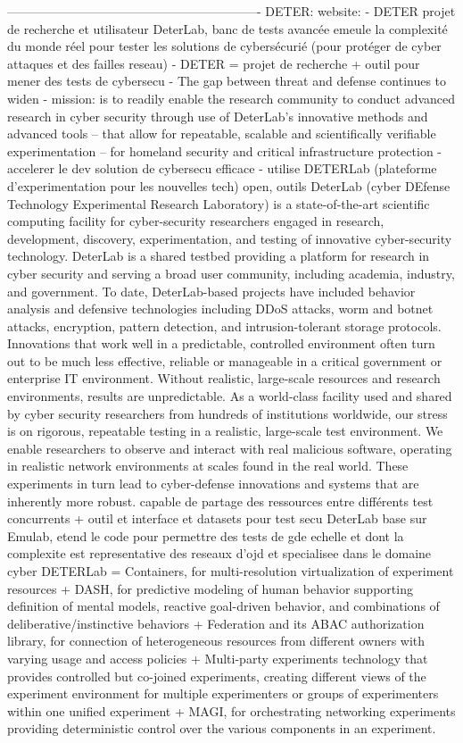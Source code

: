 -------------------------------------------------------------
DETER:
website:
- DETER projet de recherche et utilisateur DeterLab, banc de tests avancée emeule la complexité du monde réel pour tester les solutions de cybersécurié (pour protéger de cyber attaques et des failles reseau)
- DETER = projet de recherche + outil pour mener des tests de cybersecu
- The gap between threat and defense continues to widen
- mission: is to readily enable the research community to conduct advanced research in cyber security through use of DeterLab's innovative methods and advanced tools -- that allow for repeatable, scalable and scientifically verifiable experimentation -- for homeland security and critical infrastructure protection
- accelerer le dev solution de cybersecu efficace
- utilise DETERLab (plateforme d'experimentation pour les nouvelles tech) open, outils
DeterLab (cyber DEfense Technology Experimental Research Laboratory) is a state-of-the-art scientific computing facility for cyber-security researchers engaged in research, development, discovery, experimentation, and testing of innovative cyber-security technology. DeterLab is a shared testbed providing a platform for research in cyber security and serving a broad user community, including academia, industry, and government. To date, DeterLab-based projects have included behavior analysis and defensive technologies including DDoS attacks, worm and botnet attacks, encryption, pattern detection, and intrusion-tolerant storage protocols.
Innovations that work well in a predictable, controlled environment often turn out to be much less effective, reliable or manageable in a critical government or enterprise IT environment. Without realistic, large-scale resources and research environments, results are unpredictable. As a world-class facility used and shared by cyber security researchers from hundreds of institutions worldwide, our stress is on rigorous, repeatable testing in a realistic, large-scale test environment. We enable researchers to observe and interact with real malicious software, operating in realistic network environments at scales found in the real world. These experiments in turn lead to cyber-defense innovations and systems that are inherently more robust.
capable de partage des ressources entre différents test concurrents + outil et interface et datasets pour test secu
DeterLab base sur Emulab, etend le code pour permettre des tests de gde echelle et dont la complexite est representative des reseaux d'ojd et specialisee dans le domaine cyber
DETERLab =  Containers, for multi-resolution virtualization of experiment resources + DASH, for predictive modeling of human behavior supporting definition of mental models, reactive goal-driven behavior, and combinations of deliberative/instinctive behaviors + Federation and its ABAC authorization library, for connection of heterogeneous resources from different owners with varying usage and access policies + Multi-party experiments technology that provides controlled but co-joined experiments, creating different views of the experiment environment for multiple experimenters or groups of experimenters within one unified experiment + MAGI, for orchestrating networking experiments providing deterministic control over the various components in an experiment.
